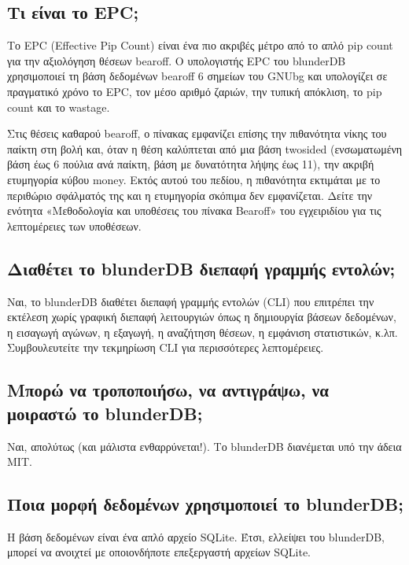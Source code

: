 \documentclass[letterpaper,10pt,greek]{sphinxmanual}
\begin{document}
\subsection{Τι είναι το EPC;}
\label{\detokenize{faq:qu-est-ce-que-l-epc}}
\sphinxAtStartPar
Το EPC (Effective Pip Count) είναι ένα πιο ακριβές μέτρο από το απλό pip count για την αξιολόγηση θέσεων bearoff. Ο υπολογιστής EPC του blunderDB χρησιμοποιεί τη βάση δεδομένων bearoff 6 σημείων του GNUbg και υπολογίζει σε πραγματικό χρόνο το EPC, τον μέσο αριθμό ζαριών, την τυπική απόκλιση, το pip count και το wastage.

\sphinxAtStartPar
Στις θέσεις καθαρού bearoff, ο πίνακας εμφανίζει επίσης την πιθανότητα νίκης του παίκτη στη βολή και, όταν η θέση καλύπτεται από μια βάση two\sphinxhyphen{}sided (ενσωματωμένη βάση έως 6 πούλια ανά παίκτη, βάση με δυνατότητα λήψης έως 11), την ακριβή ετυμηγορία κύβου money. Εκτός αυτού του πεδίου, η πιθανότητα εκτιμάται με το περιθώριο σφάλματός της και η ετυμηγορία σκόπιμα δεν εμφανίζεται. Δείτε την ενότητα «Μεθοδολογία και υποθέσεις του πίνακα Bearoff» του εγχειριδίου για τις λεπτομέρειες των υποθέσεων.


\subsection{Διαθέτει το blunderDB διεπαφή γραμμής εντολών;}
\label{\detokenize{faq:blunderdb-dispose-t-il-d-une-interface-en-ligne-de-commande}}
\sphinxAtStartPar
Ναι, το blunderDB διαθέτει διεπαφή γραμμής εντολών (CLI) που επιτρέπει την εκτέλεση χωρίς γραφική διεπαφή λειτουργιών όπως η δημιουργία βάσεων δεδομένων, η εισαγωγή αγώνων, η εξαγωγή, η αναζήτηση θέσεων, η εμφάνιση στατιστικών, κ.λπ. Συμβουλευτείτε την τεκμηρίωση CLI για περισσότερες λεπτομέρειες.


\subsection{Μπορώ να τροποποιήσω, να αντιγράψω, να μοιραστώ το blunderDB;}
\label{\detokenize{faq:puis-je-modifier-copier-partager-blunderdb}}
\sphinxAtStartPar
Ναι, απολύτως (και μάλιστα ενθαρρύνεται!). Το blunderDB διανέμεται υπό την άδεια MIT.


\subsection{Ποια μορφή δεδομένων χρησιμοποιεί το blunderDB;}
\label{\detokenize{faq:quel-format-de-donnees-utilise-blunderdb}}
\sphinxAtStartPar
Η βάση δεδομένων είναι ένα απλό αρχείο SQLite. Έτσι, ελλείψει του blunderDB, μπορεί να ανοιχτεί με οποιονδήποτε επεξεργαστή αρχείων SQLite.
\end{document}
